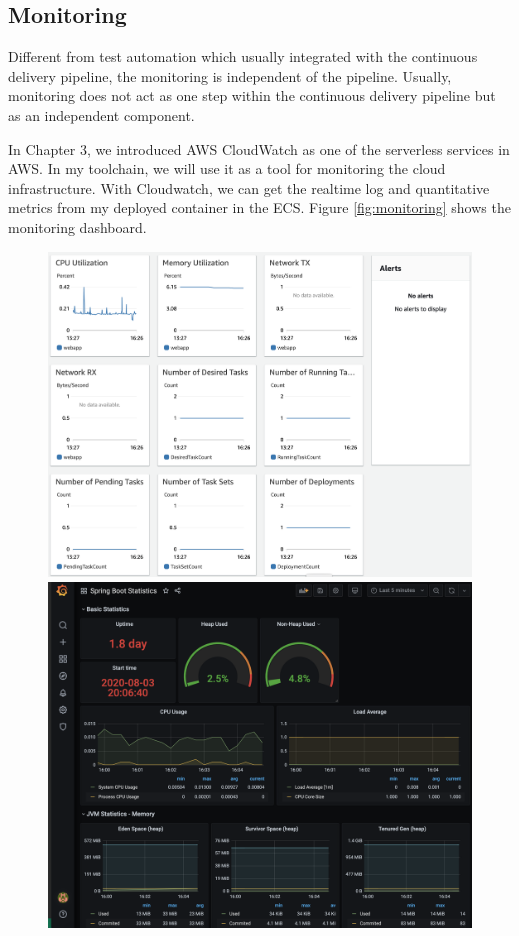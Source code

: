 \subsection{Monitoring}
Different from test automation which usually integrated with the continuous delivery pipeline, the monitoring is independent of the pipeline. Usually, monitoring does not act as one step within the continuous delivery pipeline but as an independent component.
\par
In Chapter 3, we introduced AWS CloudWatch as one of the serverless services in AWS. In my toolchain, we will use it as a tool for monitoring the cloud infrastructure. With Cloudwatch, we can get the realtime log and quantitative metrics from my deployed container in the ECS. Figure \ref{fig:monitoring} shows the monitoring dashboard.
\begin{figure}[!tbp]
     \centering
     \begin{minipage}[b]{0.47\textwidth}
       \includegraphics[width=\textwidth]{pics/monitoring.png}
     \end{minipage}
     \hfill
     \begin{minipage}[b]{0.50\textwidth}
       \includegraphics[width=\textwidth]{pics/grafana.png}

\end{minipage}
\end{figure}
